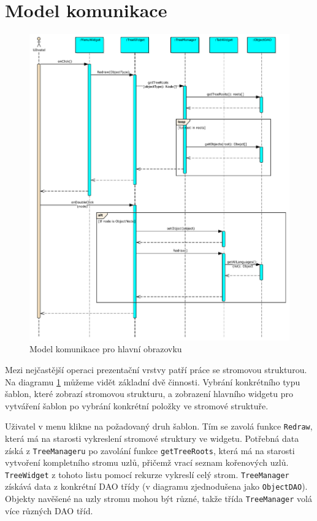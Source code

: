 \documentclass[thesis=B,czech]{resources/FITthesis}[2012/06/26]
\begin{document}
	\section{Model komunikace}
	\begin{figure}\centering
	\includegraphics[width=1\textwidth]{images/comunication_main}
	\caption[Model komunikace pro hlavní obrazovku]{Model komunikace pro hlavní obrazovku}\label{fig:comunication_main}
	\end{figure}
Mezi nejčastější operaci prezentační vrstvy patří práce se stromovou strukturou. Na diagramu \ref{fig:comunication_main} můžeme vidět základní dvě činnosti. Vybrání konkrétního typu šablon, které zobrazí stromovou strukturu, a zobrazení hlavního widgetu pro vytváření šablon po vybrání konkrétní položky ve stromové struktuře.\par

Uživatel v menu klikne na požadovaný druh šablon. Tím se zavolá funkce \texttt{Redraw}, která má na starosti vykreslení stromové struktury ve widgetu. Potřebná data získá z \texttt{TreeManageru} po zavolání funkce \texttt{getTreeRoots}, která má na starosti vytvoření kompletního stromu uzlů, přičemž vrací seznam kořenových uzlů. \texttt{TreeWidget} z tohoto listu pomocí rekurze vykreslí celý strom. \texttt{TreeManager} získává data z konkrétní DAO třídy (v diagramu zjednodušena jako \texttt{ObjectDAO}). Objekty navěšené na uzly stromu mohou být různé, takže třída \texttt{TreeManager} volá více různých DAO tříd.\par
\end{document}
